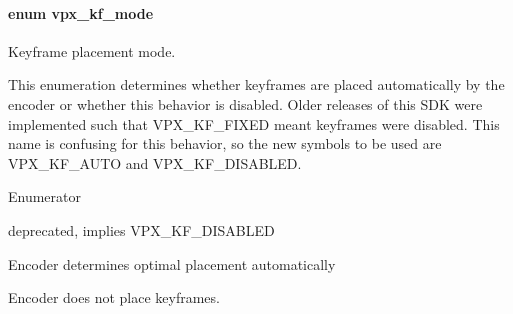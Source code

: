 \paragraph[{\texorpdfstring{vpx\+\_\+kf\+\_\+mode}{vpx_kf_mode}}]{\setlength{\rightskip}{0pt plus 5cm}enum {\bf vpx\+\_\+kf\+\_\+mode}}\hypertarget{group__encoder_ga9f461802aa4db35c04a8b23837987f40}{}\label{group__encoder_ga9f461802aa4db35c04a8b23837987f40}


Keyframe placement mode. 

This enumeration determines whether keyframes are placed automatically by the encoder or whether this behavior is disabled. Older releases of this S\+DK were implemented such that V\+P\+X\+\_\+\+K\+F\+\_\+\+F\+I\+X\+ED meant keyframes were disabled. This name is confusing for this behavior, so the new symbols to be used are V\+P\+X\+\_\+\+K\+F\+\_\+\+A\+U\+TO and V\+P\+X\+\_\+\+K\+F\+\_\+\+D\+I\+S\+A\+B\+L\+ED. \begin{Desc}
\item[Enumerator]\par
\begin{description}
\item[{\em 
V\+P\+X\+\_\+\+K\+F\+\_\+\+F\+I\+X\+ED\hypertarget{group__encoder_gga9f461802aa4db35c04a8b23837987f40a6bd87eea515c65661a5241a0f01e44a6}{}\label{group__encoder_gga9f461802aa4db35c04a8b23837987f40a6bd87eea515c65661a5241a0f01e44a6}
}]deprecated, implies V\+P\+X\+\_\+\+K\+F\+\_\+\+D\+I\+S\+A\+B\+L\+ED \item[{\em 
V\+P\+X\+\_\+\+K\+F\+\_\+\+A\+U\+TO\hypertarget{group__encoder_gga9f461802aa4db35c04a8b23837987f40ab1b423e78f72e77d2dce755d6c9652f8}{}\label{group__encoder_gga9f461802aa4db35c04a8b23837987f40ab1b423e78f72e77d2dce755d6c9652f8}
}]Encoder determines optimal placement automatically \item[{\em 
V\+P\+X\+\_\+\+K\+F\+\_\+\+D\+I\+S\+A\+B\+L\+ED\hypertarget{group__encoder_gga9f461802aa4db35c04a8b23837987f40a56513f60cbf3434ca0092173005d0ab2}{}\label{group__encoder_gga9f461802aa4db35c04a8b23837987f40a56513f60cbf3434ca0092173005d0ab2}
}]Encoder does not place keyframes. \end{description}
\end{Desc}


